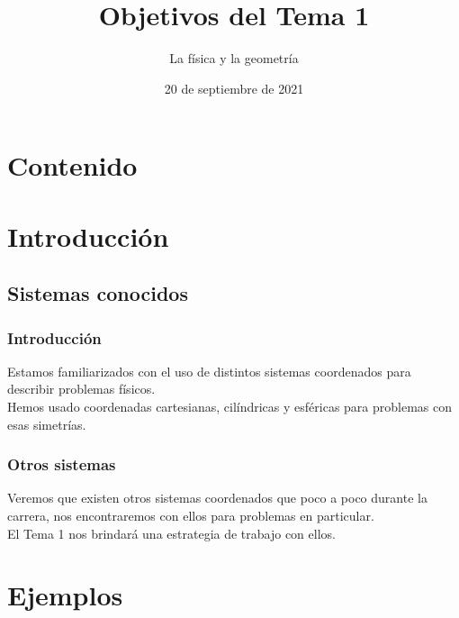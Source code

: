\documentclass[12pt]{beamer}
\date{20 de septiembre de 2021}
\title{Objetivos del Tema 1}
\subtitle{La física y la geometría}
\begin{document}
\maketitle
\fontsize{14}{14}\selectfont
{}
\section*{Contenido}
\section{Introducción}
\subsection{Sistemas conocidos}
\begin{frame}
\frametitle{Introducción}
Estamos familiarizados con el uso de distintos sistemas coordenados para describir problemas físicos.
\\
\bigskip
\pause
Hemos usado coordenadas cartesianas, cilíndricas y esféricas para problemas con esas simetrías.
\end{frame}
\begin{frame}
\frametitle{Otros sistemas}
Veremos que existen otros sistemas coordenados que poco a poco durante la carrera, nos encontraremos con ellos para problemas en particular.
\\
\bigskip
\pause
El Tema 1 nos brindará una estrategia de trabajo con ellos.
\end{frame}
\section{Ejemplos}
\end{document}
